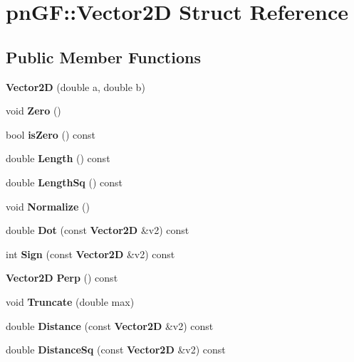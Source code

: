 \section{pn\+GF\+:\+:Vector2D Struct Reference}
\label{structpn_g_f_1_1_vector2_d}
\subsection*{Public Member Functions}
\begin{DoxyCompactItemize}
\item 
\mbox{\label{structpn_g_f_1_1_vector2_d_a19e9fc028c956b369612082540c452f7}} 
{\bfseries Vector2D} (double a, double b)
\item 
\mbox{\label{structpn_g_f_1_1_vector2_d_a254e068bf5d066ba7671a65fc1011bfc}} 
void {\bfseries Zero} ()
\item 
\mbox{\label{structpn_g_f_1_1_vector2_d_a269c59e0dcd5bed6cc3d5a2cd18351c0}} 
bool {\bfseries is\+Zero} () const
\item 
\mbox{\label{structpn_g_f_1_1_vector2_d_a3468f524b12cd533301bd51a026de885}} 
double {\bfseries Length} () const
\item 
\mbox{\label{structpn_g_f_1_1_vector2_d_ad22deae7c28bce47f7d7f6699d19c493}} 
double {\bfseries Length\+Sq} () const
\item 
\mbox{\label{structpn_g_f_1_1_vector2_d_a2a269d43f724ed2a673dbe3585db8e80}} 
void {\bfseries Normalize} ()
\item 
\mbox{\label{structpn_g_f_1_1_vector2_d_af7a32bba4504a63ddae41bf4a22174ec}} 
double {\bfseries Dot} (const \textbf{ Vector2D} \&v2) const
\item 
\mbox{\label{structpn_g_f_1_1_vector2_d_ad7149339b728c251073cc71ee99c15e8}} 
int {\bfseries Sign} (const \textbf{ Vector2D} \&v2) const
\item 
\mbox{\label{structpn_g_f_1_1_vector2_d_a91765bc24627b038b3186993dfe67e65}} 
\textbf{ Vector2D} {\bfseries Perp} () const
\item 
\mbox{\label{structpn_g_f_1_1_vector2_d_a25a7be1dd9dc96c5657b935ec07a482e}} 
void {\bfseries Truncate} (double max)
\item 
\mbox{\label{structpn_g_f_1_1_vector2_d_a4c05a2b917c9de695c8845598a1e86de}} 
double {\bfseries Distance} (const \textbf{ Vector2D} \&v2) const
\item 
\mbox{\label{structpn_g_f_1_1_vector2_d_abf35d8d3b938adbe689bcd0c32b51bf8}} 
double {\bfseries Distance\+Sq} (const \textbf{ Vector2D} \&v2) const
\item 

\end{DoxyCompactItemize}
